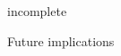 \documentclass[amt, manuscript]{copernicus}
\newcommand{\todo}[1]{{\color{red} #1}}
\begin{document}




\todo{incomplete}

\todo{Future implications}




 


 
















\end{document}
